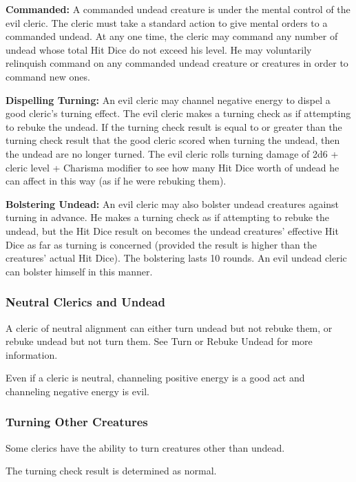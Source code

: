 \textbf{Commanded:} A commanded undead creature is under the mental control of the evil cleric. The cleric must take a standard action to give mental orders to a commanded undead. At any one time, the cleric may command any number of undead whose total Hit Dice do not exceed his level. He may voluntarily relinquish command on any commanded undead creature or creatures in order to command new ones.

\textbf{Dispelling Turning:} An evil cleric may channel negative energy to dispel a good cleric's turning effect. The evil cleric makes a turning check as if attempting to rebuke the undead. If the turning check result is equal to or greater than the turning check result that the good cleric scored when turning the undead, then the undead are no longer turned. The evil cleric rolls turning damage of 2d6 + cleric level + Charisma modifier to see how many Hit Dice worth of undead he can affect in this way (as if he were rebuking them).

\textbf{Bolstering Undead:} An evil cleric may also bolster undead creatures against turning in advance. He makes a turning check as if attempting to rebuke the undead, but the Hit Dice result on  becomes the undead creatures' effective Hit Dice as far as turning is concerned (provided the result is higher than the creatures' actual Hit Dice). The bolstering lasts 10 rounds. An evil undead cleric can bolster himself in this manner.

\subsubsection{Neutral Clerics and Undead}
A cleric of neutral alignment can either turn undead but not rebuke them, or rebuke undead but not turn them. See Turn or Rebuke Undead for more information.

Even if a cleric is neutral, channeling positive energy is a good act and channeling negative energy is evil.


\subsubsection{Turning Other Creatures}
Some clerics have the ability to turn creatures other than undead.

The turning check result is determined as normal.